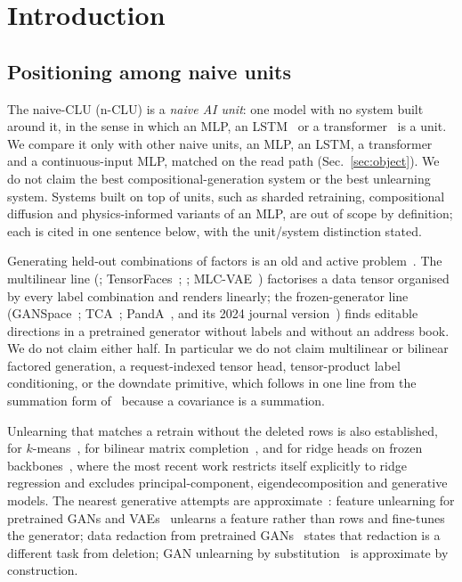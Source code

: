 \documentclass{article} %
\begin{document}
\section{Introduction}
\label{sec:intro}

\subsection{Positioning among naive units}
\label{sec:positioning}

The naive-CLU (n-CLU) is a \emph{naive AI unit}: one model with no system built around it, in the sense
in which an MLP, an LSTM~\citep{hochreiter_long_1997} or a transformer~\citep{vaswani_attention_2023} is a unit. We compare it only with other naive units, an
MLP, an LSTM, a transformer and a continuous-input MLP, matched on the read path
(Sec.~\ref{sec:object}). We do not claim the best compositional-generation system or the best
unlearning system. Systems built on top of units, such as sharded retraining, compositional
diffusion and physics-informed variants of an MLP, are out of scope by definition; each is cited
in one sentence below, with the unit/system distinction stated.

Generating held-out combinations of factors is an old and active problem~\citep{du_compositional_2020,avidan_compositional_2022}. The multilinear
line (\citealp{tenenbaum_separating_2000};
TensorFaces~\citep{goos_multilinear_2002}; \citealp{vlasic_face_2005}; MLC-VAE~\citep{georgopoulos_multilinear_2020}) factorises a data tensor organised by every label combination and
renders linearly; the frozen-generator line (GANSpace~\citep{harkonen_ganspace_2020}; TCA~\citep{oldfield_tensor_2021}; PandA~\citep{oldfield_panda_2023}, and its
2024 journal version~\citep{oldfield_bilinear_2024}) finds editable directions in a pretrained generator without labels and
without an address book. We do not claim either half. In particular we do not claim
multilinear or bilinear factored generation, a request-indexed tensor head, tensor-product
label conditioning, or the downdate primitive, which follows in one line from the summation
form of~\citet{cao_towards_2015} because a covariance is a summation.

Unlearning that matches a retrain without the deleted rows is also established, for $k$-means~\citep{ginart_making_2019}, for bilinear
matrix completion~\citep{xu_netflix_2023}, and for ridge heads on frozen backbones~\citep{ceci_exact_2027}, where the most recent work
restricts itself explicitly to ridge regression and excludes principal-component,
eigendecomposition and generative models. The nearest generative attempts are approximate~\citep{kong_approximate_2022}:
feature unlearning for pretrained GANs and VAEs~\citep{moon_feature_2024} unlearns a feature rather than rows and
fine-tunes the generator; data redaction from pretrained GANs~\citep{kong_data_2023} states that redaction is a
different task from deletion; GAN unlearning by substitution~\citep{sun_generative_2025} is approximate by construction.
\end{document}

